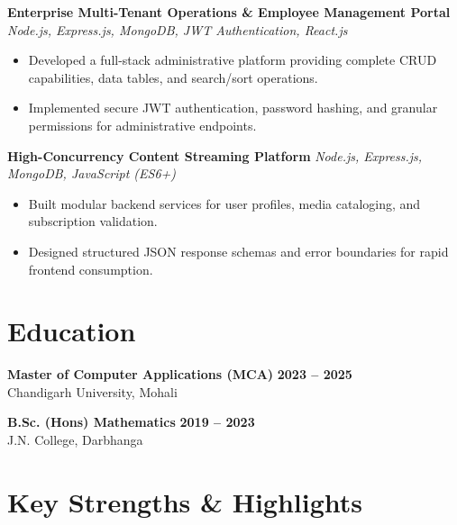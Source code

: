 \documentclass[a4paper,10pt]{article}
\begin{document}
\textbf{Enterprise Multi-Tenant Operations \& Employee Management Portal}
\hfill
\textit{Node.js, Express.js, MongoDB, JWT Authentication, React.js}

\begin{itemize}

    \item Developed a full-stack administrative platform providing complete CRUD capabilities, data tables, and search/sort operations.

    \item Implemented secure JWT authentication, password hashing, and granular permissions for administrative endpoints.

\end{itemize}


\textbf{High-Concurrency Content Streaming Platform}
\hfill
\textit{Node.js, Express.js, MongoDB, JavaScript (ES6+)}

\begin{itemize}

    \item Built modular backend services for user profiles, media cataloging, and subscription validation.

    \item Designed structured JSON response schemas and error boundaries for rapid frontend consumption.

\end{itemize}

\section*{Education}

\textbf{Master of Computer Applications (MCA)}
\hfill
\textbf{2023 -- 2025}
\\
Chandigarh University, Mohali

\vspace{3pt}

\textbf{B.Sc. (Hons) Mathematics}
\hfill
\textbf{2019 -- 2023}
\\
J.N. College, Darbhanga

\section*{Key Strengths \& Highlights}
\end{document}
